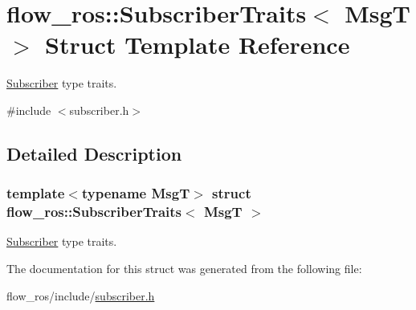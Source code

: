 \hypertarget{structflow__ros_1_1_subscriber_traits}{}\section{flow\+\_\+ros\+:\+:Subscriber\+Traits$<$ MsgT $>$ Struct Template Reference}
\label{structflow__ros_1_1_subscriber_traits}


\hyperlink{classflow__ros_1_1_subscriber}{Subscriber} type traits.  




{\ttfamily \#include $<$subscriber.\+h$>$}



\subsection{Detailed Description}
\subsubsection*{template$<$typename MsgT$>$\newline
struct flow\+\_\+ros\+::\+Subscriber\+Traits$<$ Msg\+T $>$}

\hyperlink{classflow__ros_1_1_subscriber}{Subscriber} type traits. 

The documentation for this struct was generated from the following file\+:\begin{DoxyCompactItemize}
\item 
flow\+\_\+ros/include/\hyperlink{subscriber_8h}{subscriber.\+h}\end{DoxyCompactItemize}
